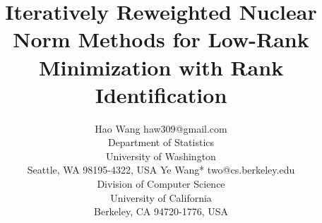 \documentclass[twoside,11pt]{article}
\numberwithin{equation}{section}
\begin{document}
\title{Iteratively Reweighted Nuclear Norm Methods for Low-Rank Minimization with Rank Identification}

\author{\name Hao Wang \email haw309@gmail.com \\
       \addr Department of Statistics\\
       University of Washington\\
       Seattle, WA 98195-4322, USA
       \AND
       \name Ye Wang* \email two@cs.berkeley.edu \\
       \addr Division of Computer Science\\
       University of California\\
       Berkeley, CA 94720-1776, USA}


\maketitle
\end{document}
